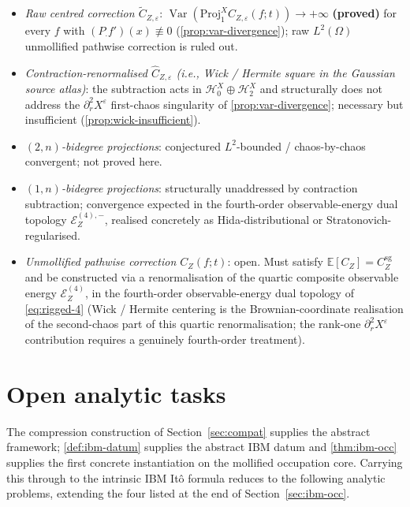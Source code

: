 \documentclass[11pt,reqno]{amsart}
\theoremstyle{plain}
\theoremstyle{definition}
\theoremstyle{remark}
\newcommand{\E}{\mathbb{E}}
\newcommand{\Hilb}{\mathcal{H}}
\newcommand{\Energy}{\mathcal{E}}
\newcommand{\IBM}{Z}
\DeclareMathOperator{\Var}{Var}
\begin{document}
\begin{itemize}
\item \emph{Raw centred correction $\tilde C_{\IBM,\varepsilon}$}:
  $\Var(\mathrm{Proj}_1^{X}C_{\IBM,\varepsilon}(f;t))\to+\infty$
  \textbf{(proved)} for every $f$ with $(P_\cdot f')(x)\not\equiv 0$
  (\cref{prop:var-divergence}); raw $L^{2}(\Omega)$ unmollified
  pathwise correction is ruled out.
\item \emph{Contraction-renormalised $\widehat C_{\IBM,\varepsilon}$
  (i.e., Wick / Hermite square in the Gaussian source atlas)}: the
  subtraction acts in $\Hilb_0^{X}\oplus\Hilb_2^{X}$ and structurally
  does not address the $\partial_r^{2}X^\varepsilon$ first-chaos
  singularity of \cref{prop:var-divergence}; necessary but
  insufficient (\cref{prop:wick-insufficient}).
\item \emph{$(2,n)$-bidegree projections}: conjectured $L^{2}$-bounded
  / chaos-by-chaos convergent; not proved here.
\item \emph{$(1,n)$-bidegree projections}: structurally unaddressed by
  contraction subtraction; convergence expected in the fourth-order
  observable-energy dual topology $\Energy_\IBM^{(4),-}$, realised
  concretely as Hida-distributional or Stratonovich-regularised.
\item \emph{Unmollified pathwise correction $C_\IBM(f;t)$}: open. Must
  satisfy $\E[C_\IBM]=C_\IBM^{\mathrm{sg}}$ and be constructed via a
  renormalisation of the quartic composite observable energy
  $\Energy_\IBM^{(4)}$, in the fourth-order observable-energy dual
  topology of \eqref{eq:rigged-4} (Wick / Hermite centering is the
  Brownian-coordinate realisation of the second-chaos part of this
  quartic renormalisation; the rank-one $\partial_r^{2}X^\varepsilon$
  contribution requires a genuinely fourth-order treatment).
\end{itemize}

\section{Open analytic tasks}\label{sec:tasks}

The compression construction of Section~\ref{sec:compat} supplies the
abstract framework; \cref{def:ibm-datum} supplies the abstract IBM
datum and \cref{thm:ibm-occ} supplies the first concrete instantiation
on the mollified occupation core. Carrying this through to the
intrinsic IBM It\^o formula reduces to the following analytic problems,
extending the four listed at the end of Section~\ref{sec:ibm-occ}.
\end{document}
